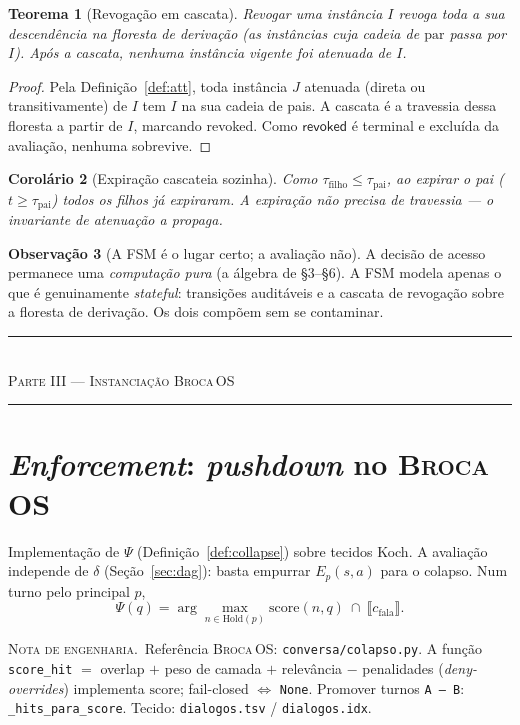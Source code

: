 \documentclass[11pt]{article}
\newcommand{\SO}{\textsc{Broca\,OS}}
\newtheorem{theorem}{Teorema}
\newtheorem{corollary}[theorem]{Corolário}
\theoremstyle{definition}
\newtheorem{remark}[theorem]{Observação}
\newcommand{\eng}[1]{\begin{engimpl}\small\textsc{Nota de engenharia.}\ #1\end{engimpl}}
\newcommand{\ext}[1]{\llbracket #1 \rrbracket}
\newcommand{\dep}{\delta}
\newcommand{\parttitle}[1]{%
  \clearpage
  \vspace*{0.5em}
  \begin{center}
  {\color{ourovivo}\rule{2.4cm}{0.5pt}}\\[6pt]
  {\fontsize{15}{18}\selectfont\scshape\color{ouro}#1}\\[6pt]
  {\color{prata}\rule{2.4cm}{0.5pt}}
  \end{center}
  \vspace{1.2em}
}
\begin{document}
\begin{theorem}[Revogação em cascata]\label{thm:cascade}
Revogar uma instância $I$ revoga toda a sua descendência na floresta de
derivação (as instâncias cuja cadeia de $\mathrm{par}$ passa por $I$). Após a
cascata, nenhuma instância vigente foi atenuada de $I$.
\end{theorem}
\begin{proof}
Pela Definição~\ref{def:att}, toda instância $J$ atenuada (direta ou
transitivamente) de $I$ tem $I$ na sua cadeia de pais. A cascata é a travessia
dessa floresta a partir de $I$, marcando \textsf{revoked}. Como
$\textsf{revoked}$ é terminal e excluída da avaliação, nenhuma sobrevive.
\end{proof}

\begin{corollary}[Expiração cascateia sozinha]
Como $\tau_{\text{filho}}\le\tau_{\text{pai}}$, ao expirar o pai
($t\ge\tau_{\text{pai}}$) todos os filhos já expiraram. A expiração não
precisa de travessia --- o invariante de atenuação a propaga.
\end{corollary}

\begin{remark}[A FSM é o lugar certo; a avaliação não]
A decisão de acesso permanece uma \emph{computação pura} (a álgebra de §3--§6).
A FSM modela apenas o que é genuinamente \emph{stateful}: transições
auditáveis e a cascata de revogação sobre a floresta de derivação. Os dois compõem sem se
contaminar.
\end{remark}

\parttitle{Parte III --- Instanciação \SO}

\section{\emph{Enforcement}: \emph{pushdown} no \SO}\label{sec:enf}

Implementação de $\Psi$ (Definição~\ref{def:collapse}) sobre tecidos Koch.
A avaliação independe de $\dep$ (Seção~\ref{sec:dag}): basta empurrar
$E_p(s,a)$ para o colapso. Num turno pelo principal $p$,
\[
  \Psi(q)=\arg\max_{n\in\mathrm{Hold}(p)} \mathrm{score}(n,q)\ \cap\
  \ext{c_{\text{fala}}}.
\]

\eng{Referência \SO: \texttt{conversa/colapso.py}. A função
\texttt{score\_hit} $=$ overlap $+$ peso de camada $+$ relevância $-$
penalidades (\emph{deny-overrides}) implementa $\mathrm{score}$; fail-closed
$\Leftrightarrow$ \texttt{None}. Promover turnos \texttt{A — B}:
\texttt{\_hits\_para\_score}. Tecido: \texttt{dialogos.tsv} /
\texttt{dialogos.idx}.}
\end{document}

